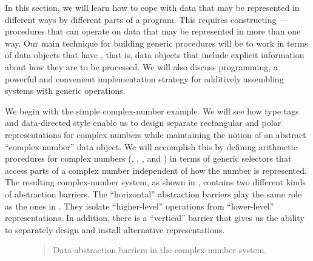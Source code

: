 In this section, we will learn how to cope with data that may be represented in
different ways by different parts of a program.  This requires constructing
---procedures that can operate on data that may be
represented in more than one way.  Our main technique for building generic
procedures will be to work in terms of data objects that have , that is, data objects that include explicit information about how they
are to be processed.  We will also discuss  programming,
a powerful and convenient implementation strategy for additively assembling
systems with generic operations.

We begin with the simple complex-number example. We will see how type tags and
data-directed style enable us to design separate rectangular and polar
representations for complex numbers while maintaining the notion of an abstract
``complex-number'' data object.  We will accomplish this by defining arithmetic
procedures for complex numbers (, ,
, and ) in terms of generic selectors that
access parts of a complex number independent of how the number is represented.
The resulting complex-number system, as shown in , contains
two different kinds of abstraction barriers.  The ``horizontal'' abstraction
barriers play the same role as the ones in .
They isolate ``higher-level'' operations from 
``lower-level''
representations.  In addition, there is a ``vertical'' barrier that
gives us the ability to separately design and install alternative
representations.

\begin{figure}[tb]
\label{Figure 2.19}
\centering
\begin{comment}
\begin{quote}
\heading{Figure 2.19:} Data-abstraction barriers in the complex-number system.

\begin{example}
           Programs that use complex numbers
  +-------------------------------------------------+
--| add-complex sub-complex mul-complex div-complex |--
  +-------------------------------------------------+
              Complex arithmetic package
---------------------------+---------------------------
          Rectangular      |         Polar
        representation     |     representation
---------------------------+---------------------------
    List structure and primitive machine arithmetic
\end{example}
\end{quote}
\end{comment}

\begin{quote}
 Data-abstraction barriers in the complex-number system.
\end{quote}
\end{figure}

